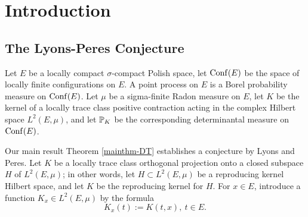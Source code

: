 \documentclass[12pt]{paper}
\numberwithin{theorem}{section}
\numberwithin{figure}{section}
\numberwithin{equation}{section}
\begin{document}
\newcommand{\Det}{\mathrm{det}}
\newcommand{\Ran}{\mathrm{Ran}}

\newcommand{\an}{\text{\, and \,}}
\newcommand{\as}{\text{\, as \,}}


\newcommand{\ch}{\mathbbm{1}}

\newcommand{\dd}{\mathrm{d}}

\renewcommand{\restriction}{\mathord{\upharpoonright}}








%






\section{Introduction}
\subsection{The Lyons-Peres Conjecture}

Let $E$ be a locally compact  $\sigma$-compact Polish space, let $\mathrm{Conf}(E)$ be the space of  locally finite configurations on $E$. A  point process on $E$ is a Borel probability measure on $\mathrm{Conf}(E)$. Let  $\mu$ be a sigma-finite Radon measure on $E$,  let $K$ be the kernel of a locally trace class positive contraction acting in the complex Hilbert space $L^2(E, \mu)$, and let $\mathbb{P}_K$ be the corresponding determinantal measure on $\mathrm{Conf}(E)$.

Our main result Theorem \ref{mainthm-DT} establishes a conjecture by Lyons and Peres.
Let $K$ be a locally trace class orthogonal projection onto a closed subspace  $H$ of $L^2(E,\mu)$; in other words,  let $H\subset L^2(E, \mu)$ be a  reproducing kernel Hilbert space, and let  $K$ be the reproducing kernel for $H$.
For $x\in E$, introduce a function $K_x\in L^2(E, \mu)$ by the formula
\begin{equation}\label{kxt}
K_x(t) := K(t,x), \ t\in E.
\end{equation}
\end{document}

